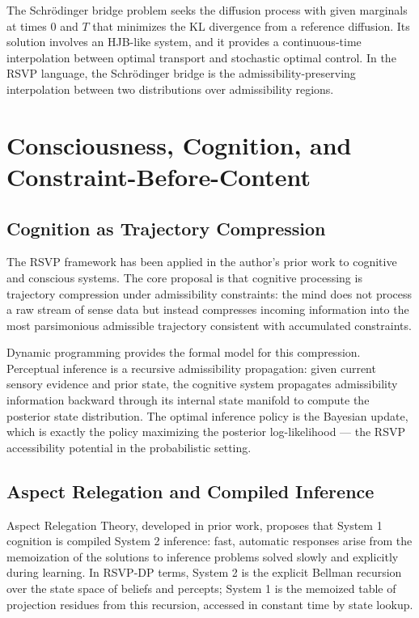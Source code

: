 \documentclass[12pt, a4paper, openany]{book}
\theoremstyle{plain}
\theoremstyle{definition}
\theoremstyle{remark}
\begin{document}
The Schrödinger bridge problem seeks the diffusion process with given marginals at times $0$ and $T$ that minimizes the KL divergence from a reference diffusion. Its solution involves an HJB-like system, and it provides a continuous-time interpolation between optimal transport and stochastic optimal control. In the RSVP language, the Schrödinger bridge is the admissibility-preserving interpolation between two distributions over admissibility regions.

\chapter{Consciousness, Cognition, and Constraint-Before-Content}

\section{Cognition as Trajectory Compression}

The RSVP framework has been applied in the author's prior work to cognitive and conscious systems. The core proposal is that cognitive processing is trajectory compression under admissibility constraints: the mind does not process a raw stream of sense data but instead compresses incoming information into the most parsimonious admissible trajectory consistent with accumulated constraints.

Dynamic programming provides the formal model for this compression. Perceptual inference is a recursive admissibility propagation: given current sensory evidence and prior state, the cognitive system propagates admissibility information backward through its internal state manifold to compute the posterior state distribution. The optimal inference policy is the Bayesian update, which is exactly the policy maximizing the posterior log-likelihood --- the RSVP accessibility potential in the probabilistic setting.

\section{Aspect Relegation and Compiled Inference}

Aspect Relegation Theory, developed in prior work, proposes that System 1 cognition is compiled System 2 inference: fast, automatic responses arise from the memoization of the solutions to inference problems solved slowly and explicitly during learning. In RSVP-DP terms, System 2 is the explicit Bellman recursion over the state space of beliefs and percepts; System 1 is the memoized table of projection residues from this recursion, accessed in constant time by state lookup.
\end{document}
